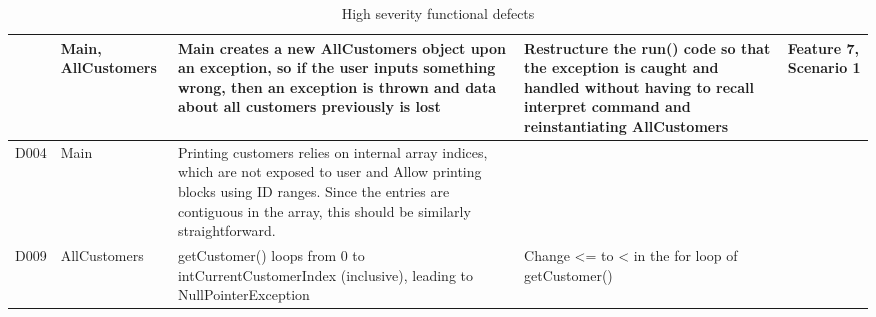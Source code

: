 \begin{table}[H]
\begin{tabularx}{\textwidth}{| c | P | X | X | P |}
& Main, AllCustomers 
& Main creates a new AllCustomers object upon an exception, so if the user inputs something wrong, then an exception is thrown and data about all customers previously is lost 
& Restructure the run() code so that the exception is caught and handled without having to recall interpret command and reinstantiating AllCustomers 
& Feature 7, Scenario 1 \\
\hline %
D004 
& Main 
& Printing customers relies on internal array indices, which are not exposed to user and Allow printing blocks using ID ranges. Since the entries are contiguous in the array, this should be similarly straightforward. 
& 
& \\
\hline %
D009 
& AllCustomers 
& getCustomer() loops from 0 to intCurrentCustomerIndex (inclusive), leading to NullPointerException
& Change <= to < in the for loop of getCustomer() 
& \\
\hline %
\hline %
\end{tabularx}
\caption{High severity functional defects}
\end{table}

